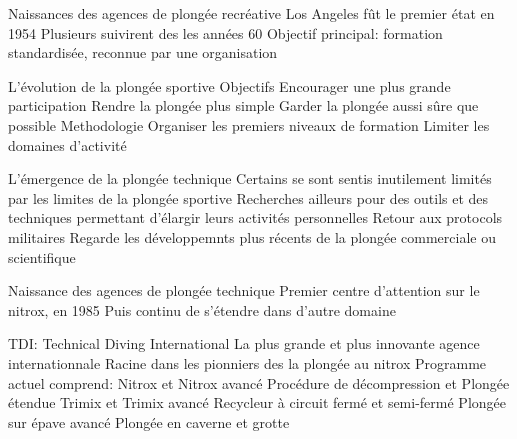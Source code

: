 \begin{frame}{\insertsubsection}
	\begin{outline}
		\1 Naissances des agences de plongée recréative
			\2 Los Angeles fût le premier état en 1954
			\2 Plusieurs suivirent des les années 60
			\2 Objectif principal: formation standardisée, reconnue par une organisation
	\end{outline}
\end{frame}

\begin{frame}{\insertsubsection}
	\begin{outline}
		\1 L'évolution de la plongée sportive
			\2 Objectifs
				\3 Encourager une plus grande participation 
				\3 Rendre la plongée plus simple
				\3 Garder la plongée aussi sûre que possible
			\2 Methodologie
				\3 Organiser les premiers niveaux de formation
				\3 Limiter les domaines d'activité
	\end{outline}
\end{frame}

\begin{frame}{\insertsubsection}
	\begin{outline}
		\1 L'émergence de la plongée technique
			\2 Certains se sont sentis inutilement limités par les limites de la plongée sportive
			\2 Recherches ailleurs pour des outils et des techniques permettant d'élargir leurs activités personnelles
				\3 Retour aux protocols militaires 
				\3 Regarde les développemnts plus récents de la plongée commerciale ou scientifique
	\end{outline}
\end{frame}

\begin{frame}{\insertsubsection}
	\begin{outline}
		\1 Naissance des agences de plongée technique
			\2 Premier centre d'attention sur le nitrox, en 1985
			\2 Puis continu de s'étendre dans d'autre domaine
	\end{outline}
\end{frame}

\begin{frame}{\insertsubsection}
	\begin{outline}
		\1 TDI: Technical Diving International
			\2 La plus grande et plus innovante agence internationnale
			\2 Racine dans les pionniers des la plongée au nitrox
			\2 Programme actuel comprend:
				\3 Nitrox et Nitrox avancé
				\3 Procédure de décompression et Plongée étendue
				\3 Trimix et Trimix avancé
				\3 Recycleur à circuit fermé et semi-fermé
				\3 Plongée sur épave avancé
				\3 Plongée en caverne et grotte
	\end{outline}
\end{frame}


